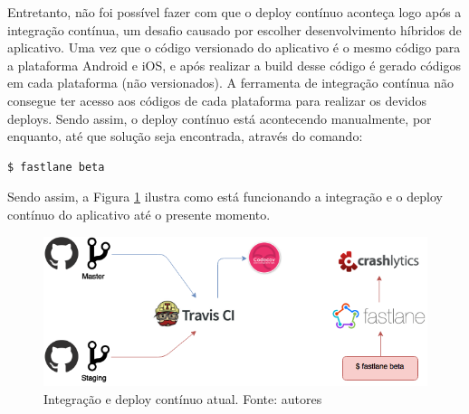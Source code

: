 Entretanto, não foi possível fazer com que o deploy contínuo aconteça logo após a integração contínua, um desafio causado por escolher desenvolvimento híbridos de aplicativo. Uma vez que o código versionado do aplicativo é o mesmo código para a plataforma Android e iOS, e após realizar a build desse código é gerado códigos em cada plataforma (não versionados). A ferramenta de integração contínua não consegue ter acesso aos códigos de cada plataforma para realizar os devidos deploys. Sendo assim, o deploy contínuo está acontecendo manualmente, por enquanto, até que solução seja encontrada, através do comando:

\begin{lstlisting}[language=bash]
  $ fastlane beta
\end{lstlisting}

Sendo assim, a Figura \ref{img:integracao_deploy_continuo_atual} ilustra como está funcionando a integração e o deploy contínuo do aplicativo até o presente momento.

\begin{figure}[H]
    \centering
    \includegraphics[scale=0.5]{figuras/ci_currently.png}
    \caption[Integração e deploy contínuo atual]{Integração e deploy contínuo atual. Fonte: autores}
    \label{img:integracao_deploy_continuo_atual}
\end{figure}
